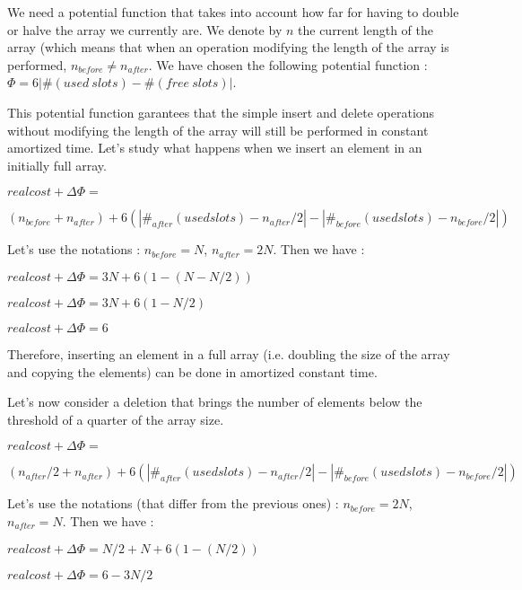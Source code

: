 We need a potential function that takes into account how far for having to double or halve the array we currently are. We denote by $n$ the current length of the array (which means that when an operation modifying the length of the array is performed, $n_{before} \neq n_{after}$. We have chosen the following potential function : $\Phi = 6 |\# (used\ slots) - \# (free\ slots)|$.

This potential function garantees that the simple insert and delete operations without modifying the length of the array will still be performed in constant amortized time. Let's study what happens when we insert an element in an initially full array.

$real cost + \Delta\Phi =$

$ (n_{before} + n_{after}) +6(|\#_{after} (used slots)-n_{after}/2|-|\#_{before} (used slots)-n_{before}/2|)$

Let's use the notations : $n_{before} = N$, $n_{after} = 2N$. Then we have :

$real cost + \Delta\Phi = 3N +6(1-(N-N/2))$

$real cost + \Delta\Phi = 3N +6(1-N/2)$

$real cost + \Delta\Phi = 6$

Therefore, inserting an element in a full array (i.e. doubling the size of the array and copying the elements) can be done in amortized constant time.

Let's now consider a deletion that brings the number of elements below the threshold of a quarter of the array size.

$real cost + \Delta\Phi =$

$ (n_{after}/2 + n_{after}) +6(|\#_{after} (used slots)-n_{after}/2|-|\#_{before} (used slots)-n_{before}/2|)$

Let's use the notations (that differ from the previous ones) : $n_{before} = 2N$, $n_{after} = N$. Then we have :

$real cost + \Delta\Phi = N/2+N +6(1-(N/2))$

$real cost + \Delta\Phi = 6 -3N/2$
